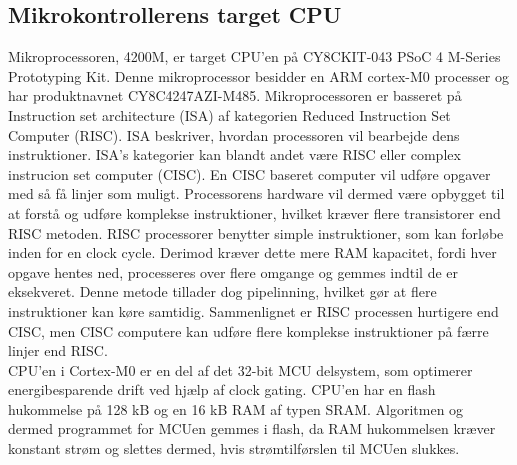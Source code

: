 \subsection{Mikrokontrollerens target CPU}
Mikroprocessoren, 4200M, er target CPU'en på CY8CKIT-043 PSoC 4 M-Series Prototyping Kit. Denne mikroprocessor besidder en ARM cortex-M0 processer og har produktnavnet CY8C4247AZI-M485. Mikroprocessoren er basseret på Instruction set architecture (ISA) af kategorien Reduced Instruction Set Computer (RISC). ISA beskriver, hvordan processoren vil bearbejde dens instruktioner. ISA's kategorier kan blandt andet være RISC eller complex instrucion set computer (CISC). En CISC baseret computer vil udføre opgaver med så få linjer som muligt. Processorens hardware vil dermed være opbygget til at forstå og udføre komplekse instruktioner, hvilket kræver flere transistorer end RISC metoden. RISC processorer benytter simple instruktioner, som kan forløbe inden for en clock cycle. Derimod kræver dette mere RAM kapacitet, fordi hver opgave hentes ned, processeres over flere omgange og gemmes indtil de er eksekveret. Denne metode tillader dog pipelinning, hvilket gør at flere instruktioner kan køre samtidig. Sammenlignet er RISC processen hurtigere end CISC, men CISC computere kan udføre flere komplekse instruktioner på færre linjer end RISC. \citep{CYPRESS2016Cortexm0,Semiconductor20164200M,Yadav2016}\\ 
CPU'en i Cortex-M0 er en del af det 32-bit MCU delsystem, som optimerer energibesparende drift ved hjælp af clock gating. %
CPU'en har en flash hukommelse på 128 kB og en 16 kB RAM af typen SRAM. Algoritmen og dermed programmet for MCUen gemmes i flash, da RAM hukommelsen kræver konstant strøm og slettes dermed, hvis strømtilførslen til MCUen slukkes. \citep{Semiconductor20164200M}
%
